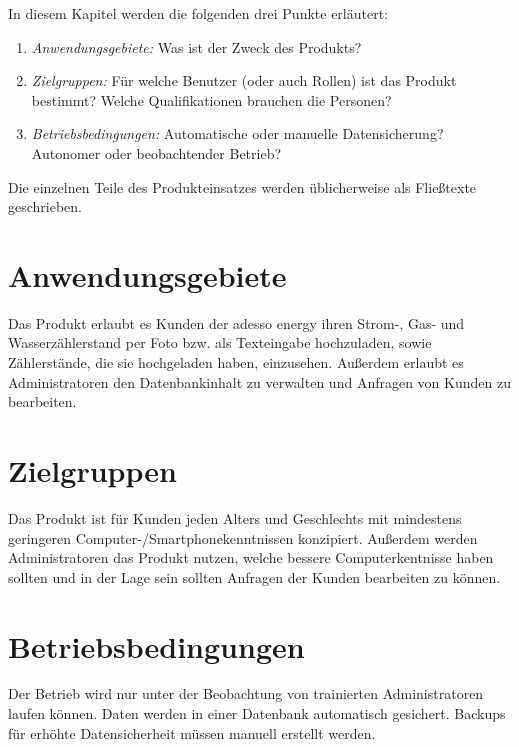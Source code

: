 \begin{tcolorbox}
	In diesem Kapitel werden die folgenden drei Punkte erläutert:
	\begin{enumerate}
		\item \textit{Anwendungsgebiete:} Was ist der Zweck des Produkts?
		\item \textit{Zielgruppen:} Für welche Benutzer (oder auch Rollen) ist das Produkt bestimmt?
		Welche Qualifikationen brauchen die Personen?
		\item \textit{Betriebsbedingungen:} Automatische oder manuelle Datensicherung? 	Autonomer oder beobachtender Betrieb? 	
	\end{enumerate}
	
	\noindent Die einzelnen Teile des Produkteinsatzes werden üblicherweise als Fließtexte geschrieben.
	\end{tcolorbox}
	
	\section{Anwendungsgebiete}
	
	Das Produkt erlaubt es Kunden der adesso energy ihren Strom-, Gas- und Wasserzählerstand per Foto bzw. als Texteingabe hochzuladen, sowie Zählerstände, die sie hochgeladen haben, einzusehen.
	Außerdem erlaubt es Administratoren den Datenbankinhalt zu verwalten und Anfragen von Kunden zu bearbeiten.
	
	\section{Zielgruppen}
	
	Das Produkt ist für Kunden jeden Alters und Geschlechts mit mindestens geringeren Computer-/Smartphonekenntnissen konzipiert.
	Außerdem werden Administratoren das Produkt nutzen, welche bessere Computerkentnisse haben sollten und in der Lage sein sollten Anfragen der Kunden bearbeiten zu können.
	
	\section{Betriebsbedingungen}
	
	Der Betrieb wird nur unter der Beobachtung von trainierten Administratoren laufen können. Daten werden in einer Datenbank automatisch gesichert. Backups für erhöhte Datensicherheit müssen manuell erstellt werden.